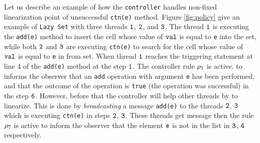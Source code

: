  Let us describe an example of how the {\tt controller} handles non-fixed linearization point of unsuccessful {\tt ctn(e)} method. Figure \ref{fig:policy} give an example of {\tt Lazy Set} with three threads $\tt 1$, $\tt 2$, and $\tt 3$. The thread $\tt 1$ is executing the {\tt add(e)} method to insert the cell whose value of $\tt val$ is equal to {\tt e} into the set, while both $\tt 2$ and $\tt 3$ are executing {\tt ctn(e)} to search for the cell whose value of $\tt val$ is equal to {\tt e} in from set. When thread $\tt 1$ reaches the triggering statement at line 4 of the {\tt add(e)} method at the step $\tt 1$. The controller rule $\rho_1$ is active. 
to informs the observer that an {\tt add} operation 
with argument {\tt e} has been performed, and that the outcome
of the operation is {\tt true} (the operation was successful) in the step $\tt 6$. However, before that the controller will help other threads
by to linearize. This is done by {\it broadcasting} a message {\tt add(e)} to the threads $\tt 2$, $\tt 3$ which is executing {\tt ctn(e)} in steps $\tt 2$, $\tt 3$. These threads get message then the rule $\rho_7$ is active to inform the observer that the element $\tt e$ is not in the list in $\tt 3$, $\tt 4$ respectively.
%
